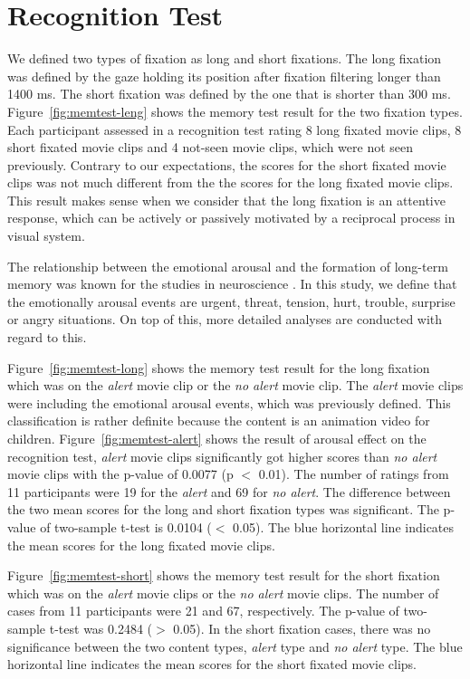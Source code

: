 \documentclass[oneside,master]{snueethesis}
\begin{document}
\section{Recognition Test}

We defined two types of fixation as long and short fixations. The long fixation was defined by the gaze holding its position after fixation filtering longer than 1400 ms. The short fixation was defined by the one that is shorter than 300 ms. Figure~\ref{fig:memtest-leng} shows the memory test result for the two fixation types. Each participant assessed in a recognition test rating 8 long fixated movie clips, 8 short fixated movie clips and 4 not-seen movie clips, which were not seen previously. Contrary to our expectations, the scores for the short fixated movie clips was not much different from the the scores for the long fixated movie clips. This result makes sense when we consider that the long fixation is an attentive response, which can be actively or passively motivated by a reciprocal process in visual system.

The relationship between the emotional arousal and the formation of long-term memory was known for the studies in neuroscience \cite{Cahill1996amyg,Cahill1998baso}. In this study, we define that the emotionally arousal events are urgent, threat, tension, hurt, trouble, surprise or angry situations. On top of this, more detailed analyses are conducted with regard to this.

Figure~\ref{fig:memtest-long} shows the memory test result for the long fixation which was on the \textit{alert} movie clip or the \textit{no alert} movie clip. The \textit{alert} movie clips were including the emotional arousal events, which was previously defined. This classification is rather definite because the content is an animation video for children. Figure~\ref{fig:memtest-alert} shows the result of arousal effect on the recognition test, \textit{alert} movie clips significantly got higher scores than \textit{no alert} movie clips with the p-value of 0.0077 (p $<$ 0.01). The number of ratings from 11 participants were 19 for the \textit{alert} and 69 for \textit{no alert}. The difference between the two mean scores for the long and short fixation types was significant. The p-value of two-sample t-test is 0.0104 ($<$ 0.05). The blue horizontal line indicates the mean scores for the long fixated movie clips.

Figure~\ref{fig:memtest-short} shows the memory test result for the short fixation which was on the \textit{alert} movie clips or the \textit{no alert} movie clips. The number of cases from 11 participants were 21 and 67, respectively. The p-value of two-sample t-test was 0.2484 ($>$ 0.05). In the short fixation cases, there was no significance between the two content types, \textit{alert} type and \textit{no alert} type. The blue horizontal line indicates the mean scores for the short fixated movie clips.
\end{document}

